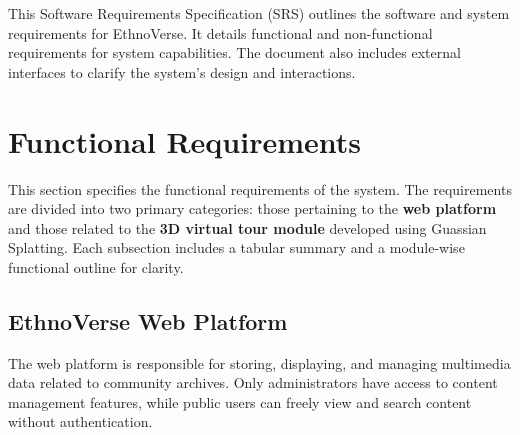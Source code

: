 

This Software Requirements Specification (SRS) outlines the software and system requirements for EthnoVerse. It details functional and non-functional requirements for system capabilities. The document also includes external interfaces to clarify the system’s design and interactions.

\section{Functional Requirements}

This section specifies the functional requirements of the system. The requirements are divided into two primary categories: those pertaining to the \textbf{web platform} and those related to the \textbf{3D virtual tour module} developed using Guassian Splatting. Each subsection includes a tabular summary and a module-wise functional outline for clarity.

\subsection{EthnoVerse Web Platform}

The web platform is responsible for storing, displaying, and managing multimedia data related to community archives. Only administrators have access to content management features, while public users can freely view and search content without authentication.



